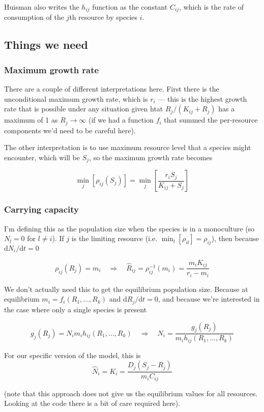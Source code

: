 \documentclass[12pt,a4paper]{article}
\newcommand{\ud}{\mathrm{d}}
\begin{document}
Huisman also writes the $h_{ij}$ function as the constant $C_{ij}$,
which is the rate of consumption of the $j$th resource by species
$i$.

\subsection{Things we need}

\subsubsection{Maximum growth rate}

There are a couple of different interpretations here.  First there is
the unconditional maximum growth rate, which is $r_i$ --- this is the
highest growth rate that is possible under any situation given htat
$R_j/(K_{ij} + R_{j})$ has a maximum of 1 as $R_j \to \infty$ (if we
had a function $f_i$ that summed the per-resource components we'd need
to be careful here).

The other interpretation is to use maximum resource level that a
species might encounter, which will be $S_j$, so the maximum growth
rate becomes

\begin{equation*}
\min_j\left[\rho_{ij}(S_j)\right] =
\min_j\left[\frac{r_i S_j}{K_{ij} + S_{j}}\right]
\end{equation*}

\subsubsection{Carrying capacity}

I'm defining this as the population size when the species is in a
monoculture (so $N_l = 0$ for $l \neq i$).  If $j$ is the limiting
resource (i.e. $\min_l[\rho_{il}] = \rho_{ij}$), then because $\ud N_i / \ud
t = 0$

\begin{equation*}
  \rho_{ij}(R_j) = m_i \quad\Rightarrow\quad
  \hat R_{ij} = \rho_{ij}^{-1}(m_i) = \frac{m_i K_{ij}}{r_i - m_i}
\end{equation*}

We don't actually need this to get the equilibrium population size.
Because at equilibrium $m_i = f_i(R_1, \ldots, R_k)$ and $\ud R_j /
\ud t = 0$, and because we're interested in the case where only a
single species is present

\begin{equation*}
  g_j(R_j) = N_i m_i h_{ij}(R_1, \ldots, R_k) \quad\Rightarrow\quad
  N_i = \frac{g_j(R_j)}{m_i h_{ij}(R_1, \ldots, R_k)}
\end{equation*}

For our specific version of the model, this is
\begin{equation*}
  \hat N_i = K_i = \frac{D_j (S_j - R_j)}{m_i C_{ij}}
\end{equation*}

(note that this approach does not give us the equilibrium values for
all resources.  Looking at the code there is a bit of care required
here).
\end{document}
